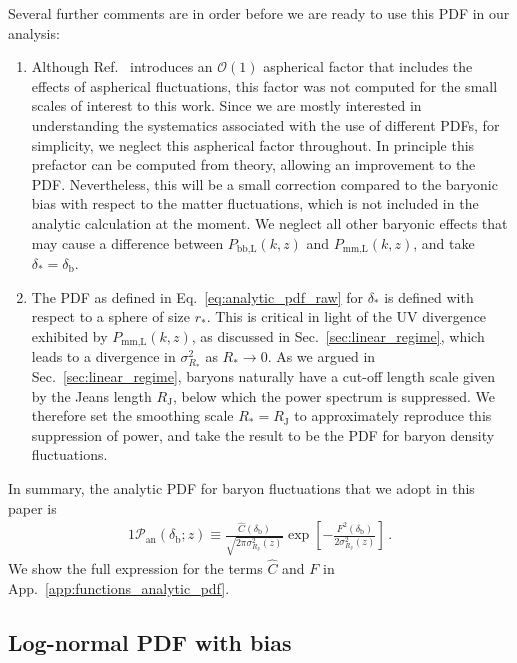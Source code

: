 \documentclass[prd,aps,10pt,nofootinbib,twocolumn,superscriptaddress,preprintnumbers,balancelastpage,longbibliography]{revtex4-1}
\begin{document}
Several further comments are in order before we are ready to use this PDF in our analysis:
\begin{enumerate}
\item Although Ref.~\cite{Ivanov:2018lcg} introduces an $\mathcal{O}(1)$ aspherical factor that includes the effects of aspherical fluctuations, this factor was not computed for the small scales of interest to this work.
Since we are mostly interested in understanding the systematics associated with the use of different PDFs, for simplicity, we neglect this aspherical factor throughout. 
In principle this prefactor can be computed from theory, allowing an improvement to the PDF\@. Nevertheless, this will be a small correction compared to the baryonic bias with respect to the matter fluctuations, which is not included in the analytic calculation at the moment.
We neglect all other baryonic effects that may cause a difference between $P_\text{bb,L}(k,z)$ and $P_\text{mm,L}(k,z)$, and take $\delta_* = \delta_\text{b}$. 

\item The PDF as defined in Eq.~\eqref{eq:analytic_pdf_raw} for $\delta_*$ is defined with respect to a sphere of size $r_*$. 
This is critical in light of the UV divergence exhibited by $P_\text{mm,L}(k,z)$, as discussed in Sec.~\ref{sec:linear_regime}, which leads to a divergence in $\sigma^2_{R_*}$ as $R_* \to 0$. As we argued in Sec.~\ref{sec:linear_regime}, baryons naturally have a cut-off length scale given by the Jeans length $R_\text{J}$, below which the power spectrum is suppressed. 
We therefore set the smoothing scale $R_* = R_\text{J}$ to approximately reproduce this suppression of power, and take the result to be the PDF for baryon density fluctuations. 

\end{enumerate}

In summary, the analytic PDF for baryon fluctuations that we adopt in this paper is
%
\begin{alignat}{1}
    \mathcal{P}_\text{an}(\delta_\text{b};z) \equiv \frac{\hat{C}(\delta_\text{b})}{\sqrt{2\pi \sigma_{R_\text{J}}^2(z)}} \exp \left[- \frac{F^2(\delta_\text{b})}{2 \sigma_{R_\text{J}}^2(z)}\right] \,.
\end{alignat}
%
We show the full expression for the terms $\hat{C}$ and $F$ in App.~\ref{app:functions_analytic_pdf}.

 
\subsection{Log-normal PDF with bias}
\label{sec:ln_bias}
\end{document}
